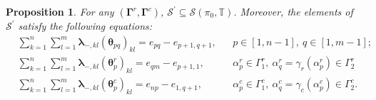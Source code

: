 \documentclass[11pt]{article}
\newcommand{\blambda}{\boldsymbol{\lambda}}
\newcommand{\btheta}{{\boldsymbol{\theta}}}
\newcommand{\bg}{\mathbf{\Gamma}}
\newtheorem{proposition}[theorem]{Proposition}%
\theoremstyle{definition}\newtheorem{definition}[theorem]{Definition}
\theoremstyle{definition}\newtheorem{remark}[theorem]{Remark}
\theoremstyle{remark}
\numberwithin{equation}{section}
\begin{document}
\begin{proposition}\label{p:bd_lm}
    For any $(\bg^r,\bg^c)$, $\mathcal{S}^\prime\subseteq \mathcal{S}(\pi_0,\mathbb{T})$. Moreover, the elements of $\mathcal{S}^\prime$ satisfy the following equations:
    \begin{align*}
        &\sum_{k=1}^n\sum_{l=1}^m\blambda_{-,kl} (\btheta_{pq})_{kl} = e_{pq}-e_{p+1,q+1}, & & p \in [1,n-1], \ q \in [1,m-1];\\
        &\sum_{k=1}^n\sum_{l=1}^m\blambda_{-,kl}( \btheta_{p}^r)_{kl} = e_{qm} - e_{p+1,1} , & & \alpha_p^r \in \Gamma_1^r, \ \alpha_q^r= \gamma_r(\alpha_p^r) \in \Gamma_2^r\\
        &\sum_{k=1}^n\sum_{l=1}^m\blambda_{-,kl}( \btheta_{p}^c)_{kl} = e_{np}-e_{1,q+1}, & & \alpha_p^c \in \Gamma_1^c, \ \alpha_q^c = \gamma_c(\alpha_p^c) \in \Gamma_2^c.
    \end{align*}
\end{proposition}
\end{document}
